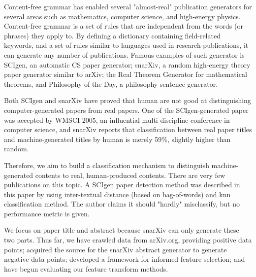 
Content-free grammar has enabled several "almost-real" publication generators for several areas such as mathematics, computer science, and high-energy physics. Content-free grammar is a set of rules that are independent from the words (or phrases) they apply to. By defining a dictionary containing field-related keywords, and a set of rules similar to languages used in research publications, it can generate any number of publications. Famous examples of such generator is SCIgen, an automatic CS paper generator; snarXiv, a random high-energy theory paper generator similar to arXiv; the Real Theorem Generator for mathematical theorems, and Philosophy of the Day, a philosophy sentence generator.

Both SCIgen and snarXiv have proved that human are not good at distinguishing computer-generated papers from real papers. One of the SCIgen-generated paper was accepted by WMSCI 2005, an influential multi-discipline conference in computer science, and snarXiv reports that classification between real paper titles and machine-generated titles by human is merely 59\%, slightly higher than random.

Therefore, we aim to build a classification mechanism to distinguish machine-generated contents to real, human-produced contents. There are very few publications on this topic. A SCIgen paper detection method was described in this paper by using inter-textual distance (based on bag-of-words) and knn classification method. The author claims it should "hardly" misclassify, but no performance metric is given.

We focus on paper title and abstract because snarXiv can only generate these two parts. Thus far, we have crawled data from arXiv.org, providing positive data points; acquired the source for the snarXiv abstract generator to generate negative data points; developed a framework for informed feature selection; and have begun evaluating our feature transform methods.